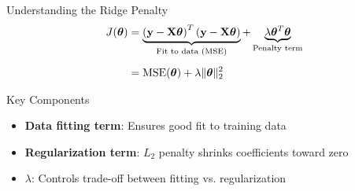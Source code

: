 \documentclass{beamer}
\begin{document}
\begin{frame}{Understanding the Ridge Penalty}
\begin{align}
J(\boldsymbol{\theta}) &= \underbrace{\left(\mathbf{y}-\mathbf{X}\boldsymbol{\theta}\right)^T\left(\mathbf{y}-\mathbf{X}\boldsymbol{\theta}\right)}_{\text{Fit to data (MSE)}} + \underbrace{\lambda \boldsymbol{\theta}^T\boldsymbol{\theta}}_{\text{Penalty term}} \\[0.5em]
&= \text{MSE}(\boldsymbol{\theta}) + \lambda \|\boldsymbol{\theta}\|_2^2
\end{align}
\pause

\begin{keypointsbox}{Key Components}
\begin{itemize}
\item \textbf{Data fitting term}: Ensures good fit to training data
\item \textbf{Regularization term}: $L_2$ penalty shrinks coefficients toward zero
\item \textbf{$\lambda$}: Controls trade-off between fitting vs. regularization
\end{itemize}
\end{keypointsbox}
\end{frame}
\end{document}
